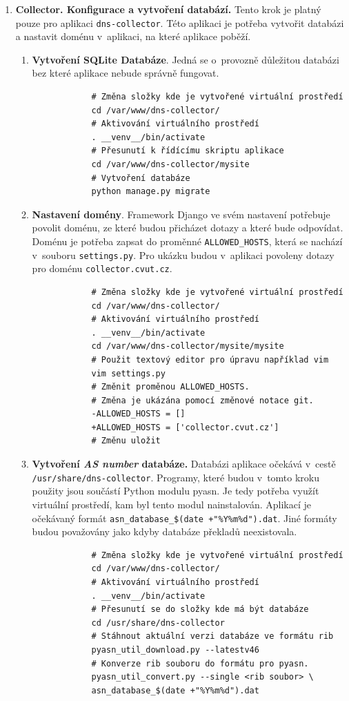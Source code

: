 \documentclass[thesis=M,czech]{src/FITthesis}[2019/12/23]
\begin{document}
\begin{enumerate}
	\item \textbf{Collector. Konfigurace a vytvoření databází.} Tento krok je platný pouze pro aplikaci \texttt{dns-collector}. Této aplikaci je potřeba vytvořit databázi a nastavit doménu v~aplikaci, na které aplikace poběží. 	
	\begin{enumerate}[i]
			\item \textbf{Vytvoření SQLite Databáze}. Jedná se o~provozně důležitou databázi bez které aplikace nebude správně fungovat.
			\begin{verbatim}
			# Změna složky kde je vytvořené virtuální prostředí
			cd /var/www/dns-collector/
			# Aktivování virtuálního prostředí
			. __venv__/bin/activate
			# Přesunutí k řídícímu skriptu aplikace
			cd /var/www/dns-collector/mysite
			# Vytvoření databáze
			python manage.py migrate
			\end{verbatim}
			\item \textbf{Nastavení domény}. Framework Django ve svém nastavení \linebreak potřebuje povolit doménu, ze které budou přicházet dotazy a které bude odpovídat. Doménu je potřeba zapsat do proměnné \linebreak \texttt{ALLOWED\_HOSTS}, která se nachází v~souboru \texttt{settings.py}. Pro ukázku budou v~aplikaci povoleny dotazy pro doménu \texttt{collector.cvut.cz}.
			\begin{verbatim}
			# Změna složky kde je vytvořené virtuální prostředí
			cd /var/www/dns-collector/
			# Aktivování virtuálního prostředí
			. __venv__/bin/activate
			cd /var/www/dns-collector/mysite/mysite
			# Použit textový editor pro úpravu například vim
			vim settings.py
			# Změnit proměnou ALLOWED_HOSTS. 
			# Změna je ukázána pomocí změnové notace git.
			-ALLOWED_HOSTS = []
			+ALLOWED_HOSTS = ['collector.cvut.cz']
			# Změnu uložit
			\end{verbatim}
			\item \textbf{Vytvoření \textit{AS number} databáze.} Databázi aplikace očekává \linebreak v~cestě \texttt{/usr/share/dns-collector}. Programy, které budou v~tomto kroku použity jsou součástí Python modulu pyasn. Je tedy potřeba využít virtuální prostředí, kam byl tento modul nainstalován. \linebreak Aplikací je očekávaný formát \texttt{asn\_database\_\$(date +"\%Y\%m\%d").dat}. \linebreak Jiné formáty budou považovány jako kdyby databáze překladů neexistovala. 
			\begin{verbatim}
			# Změna složky kde je vytvořené virtuální prostředí
			cd /var/www/dns-collector/
			# Aktivování virtuálního prostředí
			. __venv__/bin/activate
			# Přesunutí se do složky kde má být databáze
			cd /usr/share/dns-collector
			# Stáhnout aktuální verzi databáze ve formátu rib
			pyasn_util_download.py --latestv46
			# Konverze rib souboru do formátu pro pyasn.
			pyasn_util_convert.py --single <rib soubor> \
			asn_database_$(date +"%Y%m%d").dat
			

\end{verbatim}
\end{enumerate}
\end{enumerate}
\end{document}
